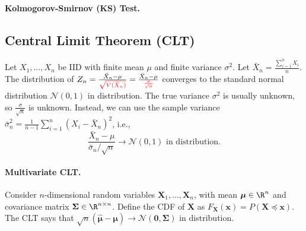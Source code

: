         \paragraph{Kolmogorov-Smirnov (KS) Test.}

      
    
    \subsection{Central Limit Theorem (CLT)}\label{sec:CLT}
        Let $X_1, \ldots, X_n$ be IID with finite mean $\mu$ and finite variance $\sigma^2$. 
        Let $\bar{X}_n = \frac{\sum_{i=1}^{n}{X_i}}{n}$.
        The distribution of $Z_n=\frac{\bar{X}_n - \mu}{\color{red}\sqrt{V(\bar{X}_n)}} = \frac{\bar{X}_n - \mu}{\color{red}\frac{\sigma}{\sqrt{n}}}$ converges to the standard normal distribution $\mathcal{N}(0, 1)$ in distribution. 
        The true variance $\sigma^2$ is usually unknown, so $\frac{\sigma}{\sqrt{n}}$ is unknown. 
        Instead, we can use the sample variance $\bar{\sigma}_n^2 = \frac{1}{n-1}\sum_{i=1}^{n}{(X_i - \bar{X}_n)^2}$, i.e.,
        \begin{equation}
            \frac{\bar{X}_n - \mu}{\bar{\sigma}_n / \sqrt{n}} \rightarrow \mathcal{N}(0, 1) \text{ in distribution}.
        \end{equation}

        \paragraph{Multivariate CLT.}
            Consider $n$-dimensional random variables $\bm{X}_1, \ldots, \bm{X}_n$, with mean $\bm{\mu} \in \R^n$ and covariance matrix $\bm{\Sigma} \in \R^{n \times n}$.
            Define the CDF of $\bm{X}$ as $F_{\bm{X}}(\bm{x}) = P( \bm{X} \preceq \bm{x})$.
            The CLT says that $\sqrt{n}(\hat{\bm{\mu}} - \bm{\mu}) \rightarrow \mathcal{N}(\bm{0}, \bm{\Sigma})$ in distribution.
    


